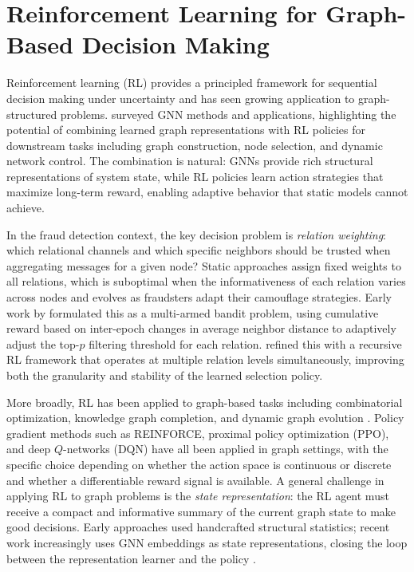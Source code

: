 \section{Reinforcement Learning for Graph-Based Decision Making}

Reinforcement learning (RL) provides a principled framework for sequential decision
making under uncertainty and has seen growing application to graph-structured problems.
\cite{zhou2020graph} surveyed GNN methods and applications, highlighting the potential
of combining learned graph representations with RL policies for downstream tasks
including graph construction, node selection, and dynamic network control. The
combination is natural: GNNs provide rich structural representations of system state,
while RL policies learn action strategies that maximize long-term reward, enabling
adaptive behavior that static models cannot achieve.

In the fraud detection context, the key decision problem is \emph{relation weighting}:
which relational channels and which specific neighbors should be trusted when aggregating
messages for a given node? Static approaches assign fixed weights to all relations, which
is suboptimal when the informativeness of each relation varies across nodes and evolves
as fraudsters adapt their camouflage strategies. Early work by \cite{dou2020enhancing}
formulated this as a multi-armed bandit problem, using cumulative reward based on
inter-epoch changes in average neighbor distance to adaptively adjust the top-$p$
filtering threshold for each relation. \cite{peng2022reinforced} refined this with a
recursive RL framework that operates at multiple relation levels simultaneously,
improving both the granularity and stability of the learned selection policy.

More broadly, RL has been applied to graph-based tasks including combinatorial
optimization, knowledge graph completion, and dynamic graph evolution
\cite{zhou2020graphrl}. Policy gradient methods such as REINFORCE, proximal policy
optimization (PPO), and deep $Q$-networks (DQN) have all been applied in graph settings,
with the specific choice depending on whether the action space is continuous or discrete
and whether a differentiable reward signal is available. A general challenge in applying
RL to graph problems is the \emph{state representation}: the RL agent must receive a
compact and informative summary of the current graph state to make good decisions. Early
approaches used handcrafted structural statistics; recent work increasingly uses GNN
embeddings as state representations, closing the loop between the representation learner
and the policy \cite{zhou2020graphrl}.

